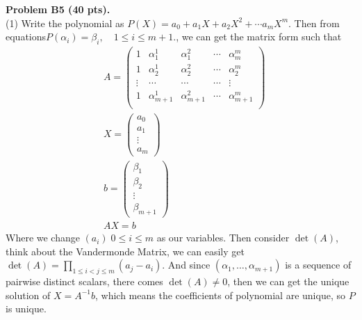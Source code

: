 \documentclass[12pt]{article}
\begin{document}
\vspace {0.25cm}\noindent
{\bf Problem B5 (40 pts).} \\
\medskip
(1)
Write the polynomial as $P(X) = a_0 + a_1 X + a_2 X^2 + \cdots a_m X^m$. Then from equations$P(\alpha_i) = \beta_i, \quad 1\leq i \leq m + 1. $, we can get the matrix form such that 
\begin{align*}
& A = 
\begin{pmatrix}
1 & \alpha_1^1 & \alpha_1^2 & \cdots & \alpha_m^m \\
1 & \alpha_2^1 & \alpha_2^2 & \cdots & \alpha_2^m \\
\vdots & \cdots & \cdots & \cdots & \vdots \\
1 & \alpha_{m+1}^1 & \alpha_{m+1}^2 & \cdots & \alpha_{m+1}^m \\
\end{pmatrix} \\
& X = 
\begin{pmatrix}
a_0 \\
a_1 \\
\vdots \\
a_m
\end{pmatrix} \\
& b = 
\begin{pmatrix}
\beta_1 \\
\beta_2  \\
\vdots \\
\beta_{m+1}
\end{pmatrix} \\
& AX = b
\end{align*}
Where we change $(a_i) \; 0 \leq i \leq m$ as our variables. Then consider $\det(A)$, think about the Vandermonde Matrix, we can easily get $\det(A) = \prod_{1 \leq i < j \leq m} (a_j - a_i)$. And since $(\alpha_1, \ldots, \alpha_{m + 1})$ is a sequence of pairwise distinct scalars, there comes $\det(A) \neq 0$, then we can get the unique solution of $X = A^{-1}b$, which means the coefficients of polynomial are unique, so $P$ is unique.
\end{document}
